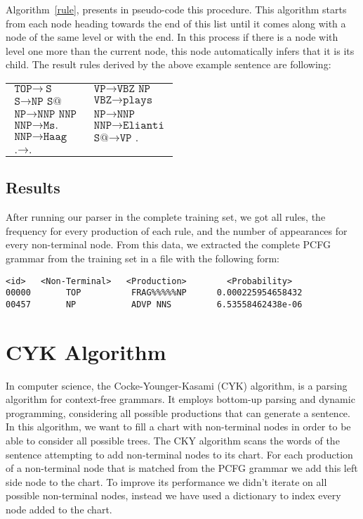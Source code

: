 \documentclass[a4paper,11pt]{article}
\begin{document}
Algorithm~\ref{rule}, presents in pseudo-code this procedure. This algorithm starts from each node heading towards the end of this list until it comes along with a node of the same level or with the end. In this process if there is a node with level one more than the current node, this node automatically infers that it is its child. The result rules derived by the above example sentence are following:
\begin{table}[h!]
\begin{scriptsize}
\begin{center}
\begin{tabular}{ l l }
$\texttt{TOP} \rightarrow\ \texttt{S}$ & $\texttt{VP} \rightarrow \texttt{VBZ NP}$ \\
$\texttt{S} \rightarrow \texttt{NP S@}$ & $\texttt{VBZ} \rightarrow \texttt{plays}$ \\
$\texttt{NP} \rightarrow \texttt{NNP NNP}$ & $\texttt{NP} \rightarrow \texttt{NNP}$ \\
$\texttt{NNP} \rightarrow \texttt{Ms.}$ & $\texttt{NNP} \rightarrow \texttt{Elianti}$ \\
$\texttt{NNP} \rightarrow \texttt{Haag}$ & $\texttt{S@} \rightarrow \texttt{VP .}$  \\
$\texttt{.} 	\rightarrow \texttt{.}$ & $ $
\end{tabular}
\end{center}
\end{scriptsize}
\end{table}

\subsection{Results}
After running our parser in the complete training set, we got all rules, the frequency for every production of each rule, and the number of appearances for every non-terminal node. From this data, we extracted the complete PCFG grammar from the training set in a file with the following form:
\begin{verbatim}
<id>   <Non-Terminal>   <Production>        <Probability>
00000       TOP          FRAG%%%%%NP      0.000225954658432 
00457       NP           ADVP NNS         6.53558462438e-06
\end{verbatim}

\section{CYK Algorithm}
\label{cyk}
In computer science, the Cocke-Younger-Kasami (CYK) algorithm, is a parsing algorithm for context-free grammars. It employs bottom-up parsing and dynamic programming, considering all possible productions that can generate a sentence. In this algorithm, we want to fill a chart with non-terminal nodes in order to be able to consider all possible trees.
The CKY algorithm scans the words of the sentence attempting to add non-terminal nodes to its chart. For each production of a non-terminal node that is matched from the PCFG grammar we add this left side node to the chart. To improve its performance we didn't iterate on all possible non-terminal nodes, instead we have used a dictionary to index every node added to the chart.
\end{document}
